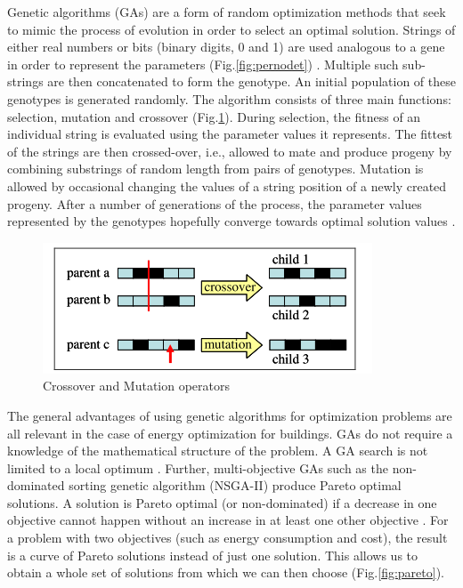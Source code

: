 Genetic algorithms (GAs) are a form of random optimization methods that seek to mimic the process of evolution in order to select an optimal solution. Strings of either real numbers or  bits (binary digits, 0 and 1) are used analogous to a gene in order to represent the parameters (Fig.\ref{fig:pernodet}) \cite{Pernodet2009} \cite{Coley2002}. Multiple such sub-strings are then concatenated to form the genotype. An initial population of these genotypes is generated randomly. The algorithm consists of three main functions: selection, mutation and crossover (Fig.\ref{fig:pernodet2}). During selection, the fitness of an individual string is evaluated using the parameter values it represents. The fittest of the strings are then crossed-over, i.e., allowed to mate and produce progeny by combining substrings of random length from pairs of genotypes. Mutation is allowed by occasional changing the values of a string position of a newly created progeny. After a number of generations of the process, the parameter values represented by the genotypes hopefully converge towards optimal solution values \cite{Coley2002}.

\begin{figure}[htbp]
\centering
\includegraphics[width =0.7\linewidth]{images/pernodet2.png}
\caption{Crossover and Mutation operators \cite{Pernodet2009}}
\label{fig:pernodet2}
\end{figure}


The general advantages of using genetic algorithms for optimization problems are all relevant in the case of energy optimization for buildings. GAs do not require a knowledge of the mathematical structure of the problem. A GA search is not limited to a local optimum \cite{Pernodet2009}. Further, multi-objective GAs such as the non-dominated sorting genetic algorithm (NSGA-II) produce Pareto optimal solutions. A solution is Pareto optimal (or non-dominated) if a decrease in one objective cannot happen without an increase in at least one other objective \cite{Deb2002}\cite{Pernodet2009}. For a problem with two objectives (such as energy consumption and cost), the result is a curve of Pareto solutions instead of just one solution. This allows us to obtain a whole set of solutions from which we can then choose (Fig.\ref{fig:pareto}). %

